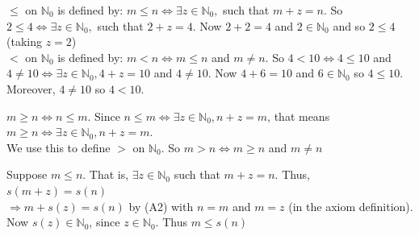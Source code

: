 \documentclass[12pt, a4paper]{exam}
\begin{document}
\begin{questions}
	\pointsdroppedatright
	\question
\vspace{0.2in}
	\pointsdroppedatright
	\question $\le $ on $\mathbb{N}_0$ is defined by: $m\le n \iff \exists z\in \mathbb{N}_0, $ such that $m+z=n$. So $2 \le 4 \iff \exists z\in \mathbb{N}_0, $ such that $2+z=4$. Now $2+2=4$ and $2\in \mathbb{N}_0$ and so $2 \le 4$ (taking $z=2$)\\ $<$ on $\mathbb{N}_0$ is defined by: $m<n \iff m \le n $ and $m \ne n$. So $4<10 \iff 4 \le 10$ and $4 \ne 10 \iff \exists z\in \mathbb{N}_0, 4+z=10$ and $4 \ne 10$. Now $4+6=10$ and $6\in \mathbb{N}_0$ so $4 \le 10$. Moreover, $4 \ne 10$ so $4<10.$
	
	\question $m \ge n \iff n \le m$. Since $n \le m \iff \exists z\in \mathbb{N}_0, n+z=m$, that means $m \ge n \iff \exists  z\in \mathbb{N}_0, n+z=m.$ \\ We use this to define $>$ on $\mathbb{N}_0$. So  $m > n \iff m \ge n$ and $ m \ne n$ 
	
	\question Suppose $m \le n$. That is, $\exists z\in \mathbb{N}_0$ such that $m+z=n.$ Thus, $s(m+z)=s(n)$ \\ $\Rightarrow m+s(z)=s(n)$ by (A2) with $n=m$ and  $m=z$ (in the axiom definition). Now $s(z)\in \mathbb{N}_0$, since $z\in \mathbb{N}_0$. Thus $m \le s(n)$
	
\end{questions}
\vspace{0.75in}
\end{document}
